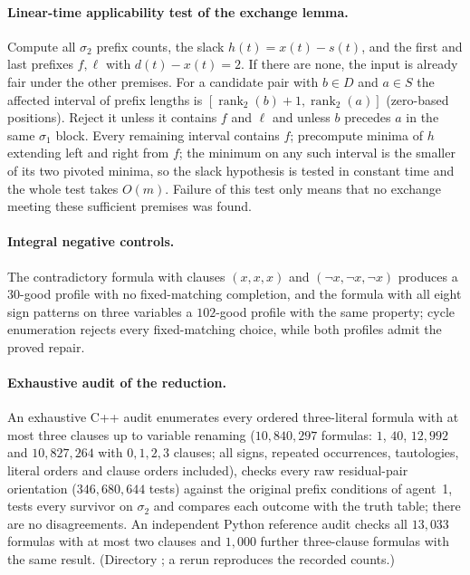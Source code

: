 \documentclass[11pt]{article}
\theoremstyle{definition}
\begin{document}
\paragraph{Linear-time applicability test of the exchange lemma.}
Compute all $\sigma_2$ prefix counts, the slack $h(t)=x(t)-s(t)$, and the first and last prefixes $f,\ell$ with $d(t)-x(t)=2$. If there are none, the input is already fair under the other premises. For a candidate pair with $b\in D$ and $a\in S$ the affected interval of prefix lengths is $[\operatorname{rank}_2(b)+1,\operatorname{rank}_2(a)]$ (zero-based positions). Reject it unless it contains $f$ and $\ell$ and unless $b$ precedes $a$ in the same $\sigma_1$ block. Every remaining interval contains $f$; precompute minima of $h$ extending left and right from $f$; the minimum on any such interval is the smaller of its two pivoted minima, so the slack hypothesis is tested in constant time and the whole test takes $O(m)$. Failure of this test only means that no exchange meeting these sufficient premises was found.

\paragraph{Integral negative controls.}
The contradictory formula with clauses $(x,x,x)$ and $(\neg x,\neg x,\neg x)$ produces a $30$-good profile with no fixed-matching completion, and the formula with all eight sign patterns on three variables a $102$-good profile with the same property; cycle enumeration rejects every fixed-matching choice, while both profiles admit the proved repair.

\paragraph{Exhaustive audit of the reduction.}
An exhaustive C++ audit enumerates every ordered three-literal formula with at most three clauses up to variable renaming ($10{,}840{,}297$ formulas: $1$, $40$, $12{,}992$ and $10{,}827{,}264$ with $0,1,2,3$ clauses; all signs, repeated occurrences, tautologies, literal orders and clause orders included), checks every raw residual-pair orientation ($346{,}680{,}644$ tests) against the original prefix conditions of agent~1, tests every survivor on $\sigma_2$ and compares each outcome with the truth table; there are no disagreements. An independent Python reference audit checks all $13{,}033$ formulas with at most two clauses and $1{,}000$ further three-clause formulas with the same result. (Directory ; a rerun reproduces the recorded counts.)
\end{document}
